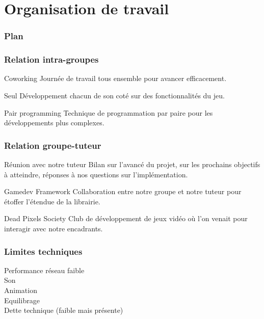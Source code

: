 \documentclass[french]{beamer}
\begin{document}
\section{Organisation de travail}

\begin{frame}
\frametitle{Plan}
\tableofcontents[currentsection]
\end{frame}

\begin{frame}
\frametitle{Relation intra-groupes}

\begin{block}{Coworking}
Journée de travail tous ensemble pour avancer efficacement.
\end{block}

\begin{block}{Seul}
Développement chacun de son coté sur des fonctionnalités du jeu.
\end{block}
\begin{block}{Pair programming}
Technique de programmation par paire pour les développements plus complexes.
\end{block}
\end{frame}


\begin{frame}
\frametitle{Relation groupe-tuteur}

\begin{block}{Réunion avec notre tuteur}
Bilan sur l'avancé du projet, sur les prochains objectifs à atteindre, réponses à nos questions sur l'implémentation.
\end{block}

\begin{block}{Gamedev Framework}
Collaboration entre notre groupe et notre tuteur pour étoffer l'étendue de la librairie.
\end{block}

\begin{block}{Dead Pixels Society}
Club de développement de jeux vidéo où l'on venait pour interagir avec notre encadrants.
\end{block}
\end{frame}


\begin{frame}
\frametitle{Limites techniques}
Performance réseau faible \\
Son \\
Animation \\
Equilibrage \\
Dette technique (faible mais présente)
\end{frame}
\end{document}
